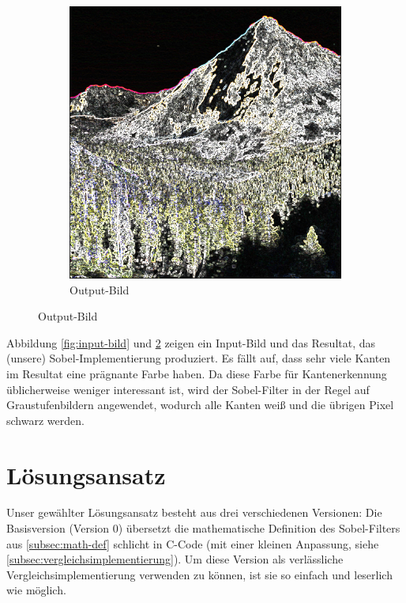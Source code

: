 \documentclass[course=erap]{aspdoc}
\begin{document}
\begin{figure}[H]
\begin{subfigure}{.5\columnwidth}
        \includegraphics[width=\columnwidth]{graphics/johnmuirtrail_sobel}
        \caption{Output-Bild}
        \label{fig:output-bild}
    \end{subfigure}
\end{figure}

Abbildung \ref{fig:input-bild} und \ref{fig:output-bild} zeigen ein Input-Bild und das Resultat, das (unsere) Sobel-Implementierung produziert.
Es fällt auf, dass sehr viele Kanten im Resultat eine prägnante Farbe haben.
Da diese Farbe für Kantenerkennung üblicherweise weniger interessant ist, wird der Sobel-Filter in der Regel auf Graustufenbildern angewendet, wodurch alle Kanten weiß und die übrigen Pixel schwarz werden.

\section{Lösungsansatz}\label{sec:losungsansatz}
Unser gewählter Lösungsansatz besteht aus drei verschiedenen Versionen:
Die Basisversion (Version 0) übersetzt die mathematische Definition des Sobel-Filters aus \ref{subsec:math-def} schlicht in C-Code (mit einer kleinen Anpassung, siehe \ref{subsec:vergleichsimplementierung}).
Um diese Version als verlässliche Vergleichsimplementierung verwenden zu können, ist sie so einfach und leserlich wie möglich.
\end{document}
